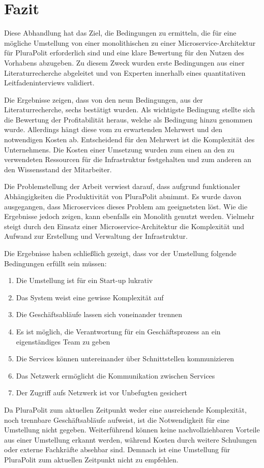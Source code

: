 \section{Fazit}

Diese Abhandlung hat das Ziel, die Bedingungen zu ermitteln, die für eine mögliche Umstellung von einer monolithischen zu einer Microservice-Architektur für PluraPolit erforderlich sind und eine klare Bewertung für den Nutzen des Vorhabens abzugeben. Zu diesem Zweck wurden erste Bedingungen aus einer Literaturrecherche abgeleitet und von Experten innerhalb eines quantitativen Leitfadeninterviews validiert.

Die Ergebnisse zeigen, dass von den neun Bedingungen, aus der Literaturrecherche, sechs bestätigt wurden. Als wichtigste Bedingung stellte sich die Bewertung der Profitabilität heraus, welche als Bedingung hinzu genommen wurde. Allerdings hängt diese vom zu erwartenden Mehrwert und den notwendigen Kosten ab. Entscheidend für den Mehrwert ist die Komplexität des Unternehmens. Die Kosten einer Umsetzung wurden zum einen an den zu verwendeten Ressourcen für die Infrastruktur festgehalten und zum anderen an den Wissensstand der Mitarbeiter.

Die Problemstellung der Arbeit verwiest darauf, dass aufgrund funktionaler Abhängigkeiten die Produktivität von PluraPolit abnimmt. Es wurde davon ausgegangen, dass Microservices dieses Problem am geeignetsten löst.
Wie die Ergebnisse jedoch zeigen, kann ebenfalls ein Monolith genutzt werden. Vielmehr steigt durch den Einsatz einer Microservice-Architektur die Komplexität und Aufwand zur Erstellung und Verwaltung der Infrastruktur.

Die Ergebnisse haben schließlich gezeigt, dass vor der Umstellung folgende Bedingungen erfüllt sein müssen:
\begin{enumerate}
	\item Die Umstellung ist für ein Start-up lukrativ
	\item Das System weist eine gewisse Komplexität auf
	\item Die Geschäftsabläufe lassen sich voneinander trennen
	\item Es ist möglich, die Verantwortung für ein Geschäftsprozess an ein eigenständiges Team zu geben
	\item Die Services können untereinander über Schnittstellen kommunizieren
	\item Das Netzwerk ermöglicht die Kommunikation zwischen Services
	\item Der Zugriff aufs Netzwerk ist vor Unbefugten gesichert
\end{enumerate}

Da PluraPolit zum aktuellen Zeitpunkt weder eine ausreichende Komplexität, noch trennbare Geschäftsabläufe aufweist, ist die Notwendigkeit für eine Umstellung nicht gegeben. Weiterführend können keine nachvollziehbaren Vorteile aus einer Umstellung erkannt werden, während Kosten durch weitere Schulungen oder externe Fachkräfte absehbar sind. Demnach ist eine Umstellung für PluraPolit zum aktuellen Zeitpunkt nicht zu empfehlen.
